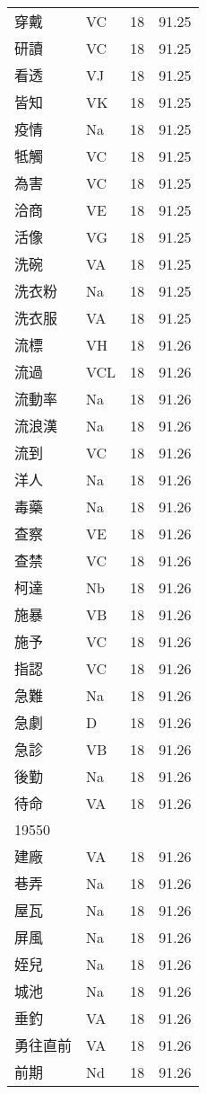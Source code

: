 \documentclass[twocolumn]{book}
\begin{document}
\begin{supertabular}{llrr}
穿戴 & VC & 18 &  91.25\\
研讀 & VC & 18 &  91.25\\
看透 & VJ & 18 &  91.25\\
皆知 & VK & 18 &  91.25\\
疫情 & Na & 18 &  91.25\\
牴觸 & VC & 18 &  91.25\\
為害 & VC & 18 &  91.25\\
洽商 & VE & 18 &  91.25\\
活像 & VG & 18 &  91.25\\
洗碗 & VA & 18 &  91.25\\
洗衣粉 & Na & 18 &  91.25\\
洗衣服 & VA & 18 &  91.25\\
流標 & VH & 18 &  91.26\\
流過 & VCL & 18 &  91.26\\
流動率 & Na & 18 &  91.26\\
流浪漢 & Na & 18 &  91.26\\
流到 & VC & 18 &  91.26\\
洋人 & Na & 18 &  91.26\\
毒藥 & Na & 18 &  91.26\\
查察 & VE & 18 &  91.26\\
查禁 & VC & 18 &  91.26\\
柯達 & Nb & 18 &  91.26\\
施暴 & VB & 18 &  91.26\\
施予 & VC & 18 &  91.26\\
指認 & VC & 18 &  91.26\\
急難 & Na & 18 &  91.26\\
急劇 & D & 18 &  91.26\\
急診 & VB & 18 &  91.26\\
後勤 & Na & 18 &  91.26\\
待命 & VA & 18 &  91.26\\
19550\\
建廠 & VA & 18 &  91.26\\
巷弄 & Na & 18 &  91.26\\
屋瓦 & Na & 18 &  91.26\\
屏風 & Na & 18 &  91.26\\
姪兒 & Na & 18 &  91.26\\
城池 & Na & 18 &  91.26\\
垂釣 & VA & 18 &  91.26\\
勇往直前 & VA & 18 &  91.26\\
前期 & Nd & 18 &  91.26\\

\end{supertabular}
\end{document}
